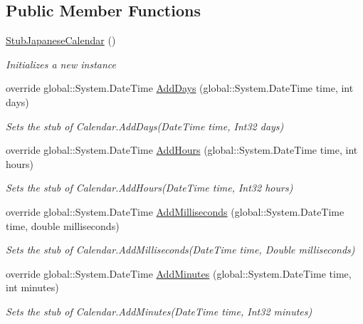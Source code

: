 \subsection*{Public Member Functions}
\begin{DoxyCompactItemize}
\item 
\hyperlink{class_system_1_1_globalization_1_1_fakes_1_1_stub_japanese_calendar_a69bb20adbe1cf38812372f081bb6c1f7}{Stub\-Japanese\-Calendar} ()
\begin{DoxyCompactList}\small\item\em Initializes a new instance\end{DoxyCompactList}\item 
override global\-::\-System.\-Date\-Time \hyperlink{class_system_1_1_globalization_1_1_fakes_1_1_stub_japanese_calendar_a5a9d02dbc5498fe66a8757b1c83055de}{Add\-Days} (global\-::\-System.\-Date\-Time time, int days)
\begin{DoxyCompactList}\small\item\em Sets the stub of Calendar.\-Add\-Days(\-Date\-Time time, Int32 days)\end{DoxyCompactList}\item 
override global\-::\-System.\-Date\-Time \hyperlink{class_system_1_1_globalization_1_1_fakes_1_1_stub_japanese_calendar_a0394f0a2fa7cc2ad9ae4827f4d92a5ca}{Add\-Hours} (global\-::\-System.\-Date\-Time time, int hours)
\begin{DoxyCompactList}\small\item\em Sets the stub of Calendar.\-Add\-Hours(\-Date\-Time time, Int32 hours)\end{DoxyCompactList}\item 
override global\-::\-System.\-Date\-Time \hyperlink{class_system_1_1_globalization_1_1_fakes_1_1_stub_japanese_calendar_af8c13e6bc177d03bc3df1544c979b36f}{Add\-Milliseconds} (global\-::\-System.\-Date\-Time time, double milliseconds)
\begin{DoxyCompactList}\small\item\em Sets the stub of Calendar.\-Add\-Milliseconds(\-Date\-Time time, Double milliseconds)\end{DoxyCompactList}\item 
override global\-::\-System.\-Date\-Time \hyperlink{class_system_1_1_globalization_1_1_fakes_1_1_stub_japanese_calendar_a9a0b7daf9abfc6034a507a08d04aaaa3}{Add\-Minutes} (global\-::\-System.\-Date\-Time time, int minutes)
\begin{DoxyCompactList}\small\item\em Sets the stub of Calendar.\-Add\-Minutes(\-Date\-Time time, Int32 minutes)\end{DoxyCompactList}\item 

\end{DoxyCompactItemize}
